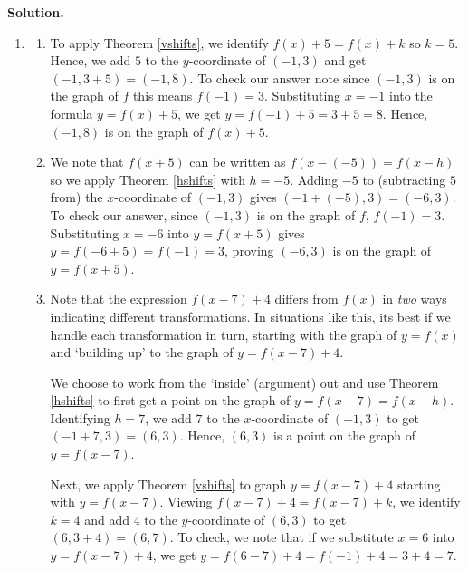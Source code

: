\documentclass{ximera}
\begin{document}
\begin{example}
\begin{enumerate}
 \end{enumerate}
 
 \newpage
 
 {\bf Solution.}
 
 \begin{enumerate}
 
 \item 
  
 \begin{enumerate}  
 
 \item To apply Theorem \ref{vshifts}, we identify $f(x)+5 = f(x)+k$  so $k = 5$.  Hence, we add $5$ to the $y$-coordinate of $(-1,3)$  and get  $(-1,3+5) = (-1,8)$.  To check our answer note since $(-1,3)$ is on the graph of $f$ this means $f(-1) = 3$.  Substituting  $x=-1$ into the formula $y = f(x)+5$, we get $y = f(-1)+5 = 3+5 = 8$.  Hence, $(-1,8)$ is on the graph of $f(x)+5$.
 
 \item We note that $f(x+5)$ can be written as $f(x-(-5)) = f(x-h)$ so we apply Theorem \ref{hshifts} with $h=-5$.  Adding $-5$ to (subtracting $5$ from) the $x$-coordinate of  $(-1,3)$ gives $(-1+(-5), 3) = (-6,3)$.  To check our answer,  since $(-1,3)$ is on the graph of $f$, $f(-1) = 3$.  Substituting $x=-6$ into $y=f(x+5)$ gives $y=f(-6+5)=f(-1)=3$, proving $(-6,3)$ is on the graph of $y=f(x+5)$.
 
 \item Note that the expression $f(x-7)+4$ differs from $f(x)$ in \textit{two} ways indicating  different transformations. In situations like this, its best if we handle each transformation in turn, starting with the graph of  $y=f(x)$ and `building up' to the graph of $y = f(x-7)+4$.  
 
 \smallskip
 
 We choose to work from the `inside' (argument) out and use Theorem \ref{hshifts} to first get a point on the graph of $y=f(x-7) = f(x-h)$. Identifying $h=7$, we add $7$ to the $x$-coordinate of $(-1,3)$ to get $(-1+7,3) = (6,3)$.  Hence, $(6,3)$ is a point on the graph of $y = f(x-7)$.  
 
 \smallskip
 
 Next, we apply Theorem \ref{vshifts} to graph $y = f(x-7)+4$ starting with $y=f(x-7)$.  Viewing $f(x-7)+4 = f(x-7)+k$, we identify $k=4$ and add  $4$ to the $y$-coordinate of $(6,3)$ to get $(6,3+4) = (6,7)$.  To check, we note that if we substitute $x=6$ into $y = f(x-7)+4$, we get $y=f(6-7)+4 = f(-1)+4 = 3+4 =7$.
 

\end{enumerate}
\end{enumerate}
\end{example}
\end{document}
